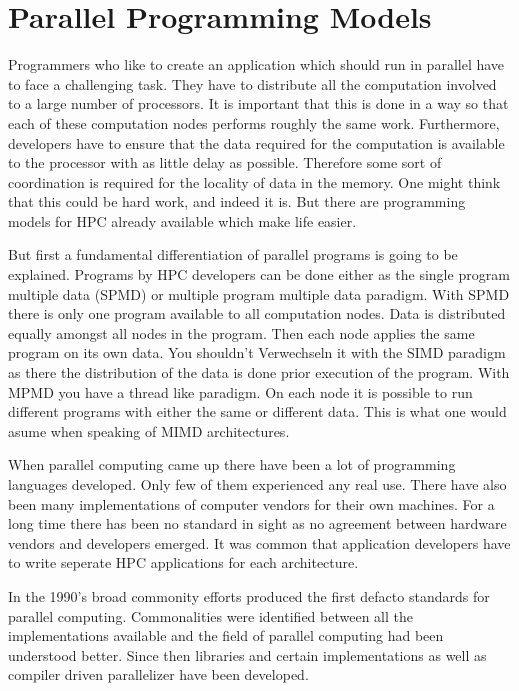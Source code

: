 \section{Parallel Programming Models}
\label{sec:programming_models}

Programmers who like to create an application which should run in
parallel have to face a challenging task. They have to distribute all
the computation involved to a large number of processors. It is
important that this is done in a way so that each of these computation
nodes performs roughly the same work. Furthermore, developers have to
ensure that the data required for the computation is available to the
processor with as little delay as possible. Therefore some sort of
coordination is required for the locality of data in the memory.
One might think that this could be hard work, and indeed it is. But
there are programming models for HPC already available which make life
easier.

But first a fundamental differentiation of parallel programs  is going
to be explained. Programs by HPC developers can be done either
as the single program multiple data (SPMD) or multiple program
multiple data paradigm. With SPMD there is only one program available
to all computation nodes. Data is distributed equally amongst all
nodes in the program. Then each node applies the same program on its
own data. You shouldn't Verwechseln it with the SIMD paradigm as there the
distribution of the data is done prior execution of the program.
With MPMD you have a thread like paradigm. On each node it is possible
to run different programs with either the same or different data. This
is what one would asume when speaking of MIMD architectures.  

When parallel computing came up there have been a lot of programming
languages developed. Only few of them experienced any real use. There
have also been many implementations of computer vendors for their own
machines. For a long time there has been no standard in sight as no
agreement between hardware vendors and developers emerged. It was
common that application developers have to write seperate HPC
applications for each architecture.

In the 1990's broad commonity efforts produced the first defacto
standards for parallel computing. Commonalities were identified
between all the implementations available and the field of parallel
computing had been understood better. Since then libraries and certain
implementations as well as compiler driven parallelizer have been
developed.

